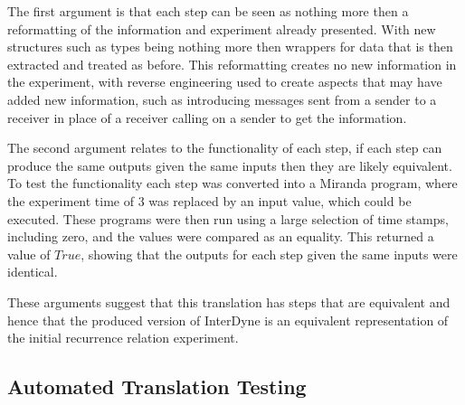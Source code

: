 \documentclass{article}
\begin{document}
The first argument is that each step can be seen as nothing more then a reformatting of the information and experiment already presented. With new structures such as types being nothing more then wrappers for data that is then extracted and treated as before. This reformatting creates no new information in the experiment, with reverse engineering used to create aspects that may have added new information, such as introducing messages sent from a sender to a receiver in place of a receiver calling on a sender to get the information.   

The second argument relates to the functionality of each step, if each step can produce the same outputs given the same inputs then they are likely equivalent. To test the functionality each step was converted into a Miranda program, where the experiment time of $3$ was replaced by an input value, which could be executed. These programs were then run using a large selection of time stamps, including zero, and the values were compared as an equality. This returned a value of $True$, showing that the outputs for each step given the same inputs were identical. 

These arguments suggest that this translation has steps that are equivalent and hence that the produced version of InterDyne is an equivalent representation of the initial recurrence relation experiment. 

\subsection{Automated Translation Testing}





%	




\end{document}
